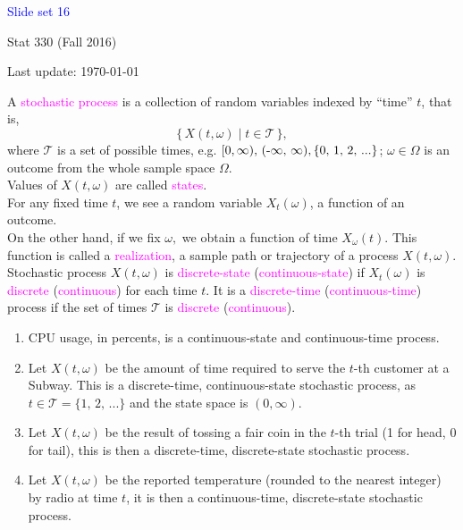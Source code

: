 \documentclass[20pt,landscape]{foils}
\newcommand{\no}{\noindent}
\newcommand{\bul}{\hspace*{.3in}{\textcolor{red}{$\bullet$ \ }}}
\begin{document}
\LogoOff

\foilhead[1.3in]{}
\centerline{\LARGE \textcolor{blue}{Slide set 16}}
\vspace{0.3in}
\centerline{\large Stat 330 (Fall 2016)}
\vspace{0.2in}
\centerline{\tiny Last update: \today}
\setcounter{page}{0}

\foilhead[-.8in]{\textcolor{blue}{Stochastic Processes}}
\no \bul  A {\textcolor{magenta}{stochastic process}} is a collection of random variables
indexed by {}``time'' $t$, that is, \[
\{\, X(t,\omega)\mid t\in\mathcal{T}\,\},\]
where $\mathcal{T}$ is a set of possible times, e.g. $[0,\infty),\,\text{(-\ensuremath{\infty}, \ensuremath{\infty}),\,\{0, 1, 2, ...\}}$;
$\omega\in\Omega$ is an outcome from the whole sample space $\Omega$.\\[.1in]
\no \bul  Values of $X(t,\omega)$ are called {\textcolor{magenta}{states}}.\\[.1in]
\no \bul For any fixed time $t$, we see a random variable $X_{t}(\omega)$,
a function of an outcome. \\[.1in]
\no \bul On the other hand, if we fix $\omega,$ we
obtain a function of time $X_{\omega}(t)$. This function is called
a {\textcolor{magenta}{realization}}, a sample path or trajectory of a process $X(t,\omega)$.\\[.1in]
\no Stochastic process $X(t,\omega)$ is {\textcolor{magenta}{discrete-state}} ({\textcolor{magenta}{continuous-state}})
if $X_{t}(\omega)$ is {\textcolor{magenta}{discrete}} ({\textcolor{magenta}{continuous}}) for
each time $t$. It is a {\textcolor{magenta}{discrete-time}} ({\textcolor{magenta}{continuous-time}})
process if the set of times $\mathcal{T}$ is {\textcolor{magenta}{discrete}} ({\textcolor{magenta}{continuous}}).   
   
\foilhead[-.8in]{\textcolor{blue}{Examples}}   
\begin{enumerate}
\item CPU usage, in percents, is a continuous-state and continuous-time process.
\item Let $X(t,\omega)$ be the amount of time required to serve
the $t$-th customer at a Subway. This is a discrete-time, continuous-state stochastic
process, as $t\in\mathcal{T}=\{1,\,2,\,...\}$ and the state space
is $(0,\infty)$.
\item Let $X(t,\omega)$ be the result of tossing a fair coin in the $t$-th
trial (1 for head, 0 for tail), this is then a discrete-time, discrete-state
stochastic process.
\item Let $X(t,\omega)$ be the reported temperature (rounded to the nearest integer) by radio at time $t$,
it is then a continuous-time, discrete-state stochastic process.
\end{enumerate}
\end{document}
